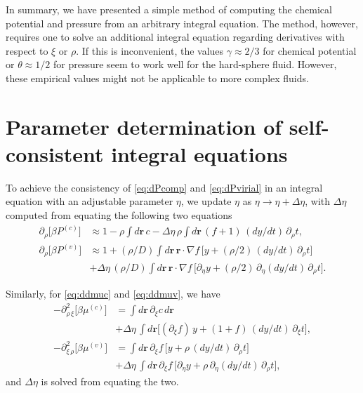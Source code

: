 \documentclass[aip,jcp,reprint,superscriptaddress]{revtex4-1}
\newcommand{\vct}[1]{\mathbf{#1}}
\providecommand{\vr}{} %
\renewcommand{\vr}{\vct{r}}
\begin{document}
In summary, we have presented a simple method
of computing the chemical potential and pressure
from an arbitrary integral equation.
%
The method, however, requires one to solve
an additional integral equation
regarding derivatives with respect to $\xi$ or $\rho$.
%
If this is inconvenient,
the values $\gamma \approx 2/3$ for chemical potential
or $\theta \approx 1/2$ for pressure
seem to work well for the hard-sphere fluid.
However, these empirical values might not be
applicable to more complex fluids.



\appendix

\section{\label{apd:sc}
Parameter determination of self-consistent integral equations}

To achieve the consistency of \eqref{eq:dPcomp} and \eqref{eq:dPvirial}
in an integral equation with an adjustable parameter $\eta$,
we update $\eta$ as $\eta \rightarrow \eta + \Delta \eta$,
with $\Delta \eta$ computed from equating the following two equations
%
\begin{align*}
  \partial_\rho \big[ \beta P^{(c)} \big]
&\approx
  1 - \rho \int d\vr \, c
  - \Delta \eta \, \rho
  \int d\vr \, (f + 1) \, (dy/dt) \, \partial_\rho t,
\\
  \partial_\rho \big[ \beta P^{(v)} \big]
&\approx
  1 + (\rho/D) \int d\vr \, \vr \cdot \nabla f \,
  \big[ y + (\rho/2) \, (dy/dt) \, \partial_\rho t \big]
  \\
&  + \Delta \eta
  \, (\rho/D) \int d\vr \, \vr \cdot \nabla f \,
  \big[ \partial_\eta y + (\rho/2) \, \partial_\eta (dy/dt) \, \partial_\rho t \big].
\end{align*}

Similarly, for \eqref{eq:ddmuc} and \eqref{eq:ddmuv},
we have
\begin{align*}
  -\partial^2_{\rho \, \xi} \big[ \beta \mu^{(c)} \big]
  &= \int d\vr \, \partial_\xi c \, d\vr \\
  & + \Delta \eta \, \int d\vr \big[
      (\partial_\xi f) \, y + (1 + f) \, (dy/dt) \, \partial_\xi t
    \big],
\\
  -\partial^2_{\xi \, \rho} \big[ \beta \mu^{(v)} \big]
  &=  \int d\vr \,
  \partial_\xi f \,
  \big[ y + \rho \, (dy/dt) \, \partial_\rho t \big]
  \\
& + \Delta \eta \, \int d\vr \,
  \partial_\xi f \,
  \big[ \partial_\eta y + \rho \, \partial_\eta (dy/dt) \, \partial_\rho t \big],
\end{align*}
and $\Delta \eta$ is solved from equating the two.



\end{document}
